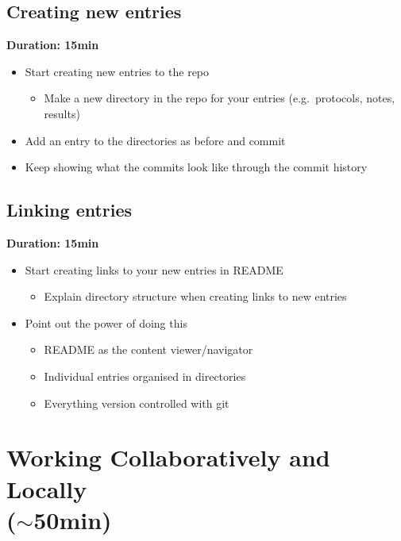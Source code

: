 \documentclass[a4paper, 12pt, oneside]{report} %
\begin{document}
\section{Creating new entries}
\label{sec:creating_new_entries}

{\bfseries Duration: 15min}

\begin{itemize}
	\item Start creating new entries to the repo
		\begin{itemize}
			\item Make a new directory in the repo for your entries (e.g.\ protocols, notes, results)
		\end{itemize}
	\item Add an entry to the directories as before and commit
	\item Keep showing what the commits look like through the commit history
\end{itemize}


\section{Linking entries}
\label{sec:linking_entries}

{\bfseries Duration: 15min}

\begin{itemize}
	\item Start creating links to your new entries in README
		\begin{itemize}
			\item Explain directory structure when creating links to new entries
		\end{itemize}
	\item Point out the power of doing this
		\begin{itemize}
			\item README as the content viewer/navigator
			\item Individual entries organised in directories
			\item Everything version controlled with git
		\end{itemize}
\end{itemize}


\chapter{Working Collaboratively and Locally\\($\sim$50min)}
\label{cha:working_collaboratively_and_locally}
\end{document}
